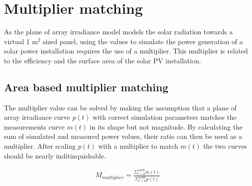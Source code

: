 \newpage
\section{Multiplier matching}
As the plane of array irradiance model models the solar radiation towards a virtual 1 m$^2$ sized panel, using the values to simulate the power generation of a solar power installation requires the use of a multiplier. This multiplier is related to the efficiency and the surface area of the solar PV installation.



\subsection{Area based multiplier matching}
The multiplier value can be solved by making the assumption that a plane of array irradiance curve $p(t)$ with correct simulation parameters matches the measurements curve $m(t)$ in its shape but not magnitude. By calculating the sum of simulated and measured power values, their ratio can then be used as a multiplier. After scaling $p(t)$ with a multiplier to match $m(t)$ the two curves should be nearly inditinquishable. 

\begin{align} 
	M_{multiplier} =  \frac{\Sigma_{t=0}^{1439} m(t)}{\Sigma_{t=0}^{1439} p(t)}\label{function_multipliermatch}
\end{align}


